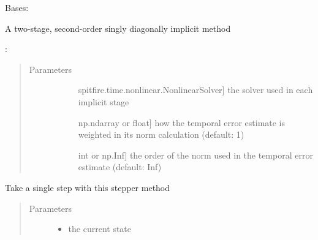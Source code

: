 \documentclass[letterpaper,10pt,english]{sphinxmanual}
\begin{document}

\begin{fulllineitems}
\label{\detokenize{spitfire.time.methods:spitfire.time.methods.SDIRK22}}
Bases: {\hyperref[\detokenize{spitfire.time.methods:spitfire.time.methods.ImplicitTimeStepper}]{}}

A two-stage, second-order singly diagonally implicit method

:
\begin{quote}\begin{description}
\item[{Parameters}] \leavevmode\begin{description}
\item[{}] \leavevmode{[}spitfire.time.nonlinear.NonlinearSolver{]}
the solver used in each implicit stage

\item[{}] \leavevmode{[}np.ndarray or float{]}
how the temporal error estimate is weighted in its norm calculation (default: 1)

\item[{}] \leavevmode{[}int or np.Inf{]}
the order of the norm used in the temporal error estimate (default: Inf)

\end{description}

\end{description}\end{quote}

\begin{fulllineitems}
\label{\detokenize{spitfire.time.methods:spitfire.time.methods.SDIRK22.single_step}}
Take a single step with this stepper method
\begin{quote}\begin{description}
\item[{Parameters}] \leavevmode\begin{itemize}
\item {} 
 \textendash{} the current state


\end{itemize}
\end{description}
\end{quote}
\end{fulllineitems}
\end{fulllineitems}
\end{document}
